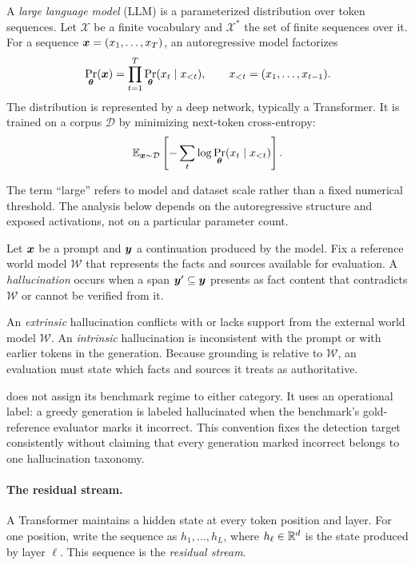 \begin{definition}
A \emph{large language model} (LLM) is a parameterized distribution over token
sequences. Let $\mathcal{X}$ be a finite vocabulary and $\mathcal{X}^{*}$ the set
of finite sequences over it. For a sequence
${\bm{x}}=(x_1,\ldots,x_T)$, an autoregressive model factorizes
\[
  \Pr_{{\bm{\theta}}}({\bm{x}})
  = \prod_{t=1}^{T}\Pr_{{\bm{\theta}}}(x_t\mid x_{<t}),
  \qquad x_{<t}=(x_1,\ldots,x_{t-1}).
\]
The distribution is represented by a deep network, typically a Transformer. It is
trained on a corpus $\mathcal{D}$ by minimizing next-token cross-entropy:
\[
  \mathbb{E}_{{\bm{x}}\sim\mathcal{D}}
  \left[-\sum_t\log\Pr_{{\bm{\theta}}}(x_t\mid x_{<t})\right].
\]
\label{def:bg:llm}
\end{definition}

The term ``large'' refers to model and dataset scale rather than a fixed numerical
threshold. The analysis below depends on the autoregressive structure and exposed
activations, not on a particular parameter count.

\begin{definition}[Hallucination]
Let ${\bm{x}}$ be a prompt and ${\bm{y}}$ a continuation produced by the model. Fix a
reference world model $\mathcal{W}$ that represents the facts and sources
available for evaluation. A \emph{hallucination} occurs when a span
${\bm{y}}'\subseteq{\bm{y}}$ presents as fact content that contradicts $\mathcal{W}$ or
cannot be verified from it.
\label{def:bg:hallucination}
\end{definition}

An \emph{extrinsic} hallucination conflicts with or lacks support from the external
world model $\mathcal{W}$. An \emph{intrinsic} hallucination is inconsistent with
the prompt or with earlier tokens in the generation. Because grounding is relative
to $\mathcal{W}$, an evaluation must state which facts and sources it treats as
authoritative.

 does not assign its benchmark regime to either
category. It uses an operational label: a greedy generation is labeled
hallucinated when the benchmark's gold-reference evaluator marks it incorrect.
This convention fixes the detection target consistently without claiming that
every generation marked incorrect belongs to one hallucination taxonomy.

\paragraph{The residual stream.}
A Transformer maintains a hidden state at every token position and layer. For one
position, write the sequence as $h_1,\ldots,h_L$, where
$h_\ell\in\mathbb{R}^d$ is the state produced by layer $\ell$. This sequence is the
\emph{residual stream}.

